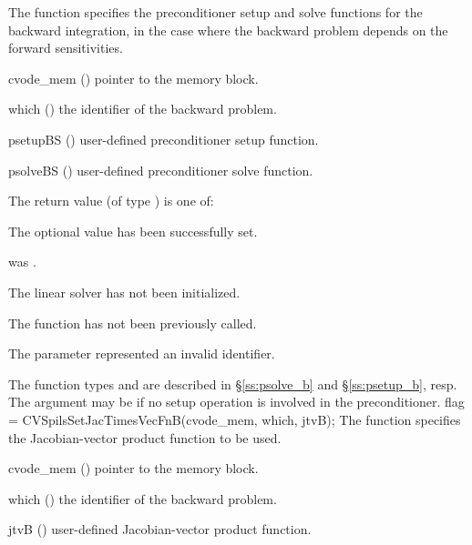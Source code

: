 {
  The function  specifies the preconditioner
  setup and solve functions for the backward integration, in the case
  where the backward problem depends on the forward sensitivities.
}
{
  \begin{args}[psetupBS]
  \item[cvode\_mem] ()
    pointer to the {\cvodes} memory block.
  \item[which] ()
    the identifier of the backward problem.
  \item[psetupBS] ()
    user-defined preconditioner setup function.
  \item[psolveBS] ()
    user-defined preconditioner solve function.
  \end{args}
}
{
  The return value  (of type ) is one of:
  \begin{args}
  \item[\Id{CVSPILS\_SUCCESS}] 
    The optional value has been successfully set.
  \item[\Id{CVSPILS\_MEM\_NULL}]
     was .
  \item[\Id{CVSPILS\_LMEM\_NULL}]
    The {\cvspils} linear solver has not been initialized.
  \item[\Id{CVSPILS\_NO\_ADJ}]
    The function  has not been previously called.
  \item[\Id{CVSPILS\_ILL\_INPUT}]
    The parameter  represented an invalid identifier.
  \end{args}
}
{
   The function types  and  are
   described in \S\ref{ss:psolve_b} and \S\ref{ss:psetup_b}, resp.
   The  argument may be  if no setup operation is involved
   in the preconditioner.
}
{
  flag = CVSpilsSetJacTimesVecFnB(cvode\_mem, which, jtvB);
}
{
  The function  specifies the Jacobian-vector 
  product function to be used.
}
{
  \begin{args}
  \item[cvode\_mem] ()
    pointer to the {\cvodes} memory block.
  \item[which] ()
    the identifier of the backward problem.
  \item[jtvB] ()
    user-defined Jacobian-vector product function.
  \end{args}
}
